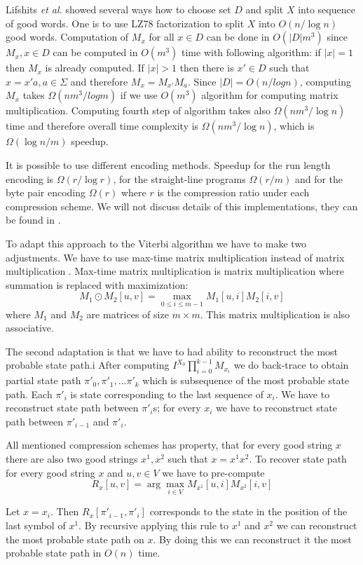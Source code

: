 Lifshits {\it et al.} \cite{Lifshits2009} showed several ways how to choose set
$D$ and split $X$ into sequence of good words. One is to use LZ78 factorization
to split $X$ into $O(n/\log n)$ good words. Computation of $M_x$ for all $x\in
D$ can be done in $O(|D|m^3)$ since $M_x,x\in D$ can be computed in $O(m^3)$
time with following algorithm: if $|x|=1$ then $M_x$ is already computed.
If $|x|>1$ then there is $x'\in D$ such that $x=x'a,a\in \Sigma$ and therefore $M_x =
M_{x'}M_{a}$. Since $|D|=O(n/log n)$, computing $M_x$ takes $\Omega(nm^3/log m)$ if
we use $O(m^3)$ algorithm for computing matrix multiplication. Computing fourth
step of algorithm takes also $\Omega(nm^3/\log n)$ time and therefore overall time complexity
is $\Omega(nm^3/\log n)$, which is $\Omega(\log n/m)$ speedup.

It is possible to use different encoding methods. Speedup for the run length encoding 
is $\Omega(r/\log r)$, for the straight-line programs $\Omega(r/m)$ and for the
byte pair encoding $\Omega(r)$ where $r$ is the compression ratio under each
compression scheme. We will not discuss details of this implementations, they
can be found in \cite{Lifshits2009}.

To adapt this approach to the Viterbi algorithm we have to make two adjustments. 
We have to use max-time matrix multiplication instead of matrix multiplication
\cite{Lifshits2009}. Max-time matrix multiplication is matrix multiplication
where summation is replaced with maximization:
\[M_1\odot M_2 [u,v] = \max_{0\leq i\leq m-1}M_1[u,i]M_2[i,v] \]
where $M_1$ and $M_2$ are matrices of size $m\times m$. This matrix
multiplication is also associative.

The second adaptation is that we have to had ability to reconstruct 
the most probable state path.i
After computing $I^{X_0}\prod_{i=0}^{k-1}M_{x_i}$ we do back-trace to obtain 
partial state path $\pi'_0,\pi'_1,\dots \pi'_{k}$ which is subsequence of the
most probable state path. Each $\pi'_i$ is state corresponding to the last
sequence of $x_i$. We have to reconstruct state path between $\pi'_i$s; for
every $x_i$ we have to reconstruct state path between $\pi'_{i-1}$ and $\pi'_i$.

All mentioned compression schemes has property,
that for every good string $x$ there are also two good strings $x^1,x^2$ such
that $x=x^1x^2$. To recover state path for every good string $x$ and $u,v\in V$
we have to pre-compute \[R_x[u,v] = \arg\max_{i\in V}M_{x^1}[u,i]M_{x^2}[i,v]\]

Let $x=x_i$. Then $R_{x}[\pi'_{i-1},\pi'_{i}]$ corresponds to the state in the
position of the last symbol of $x^1$. By recursive applying this rule to $x^1$
and $x^2$ we can reconstruct the most probable state path on $x$. By doing this
we can reconstruct it the most probable state path in $O(n)$ time.

